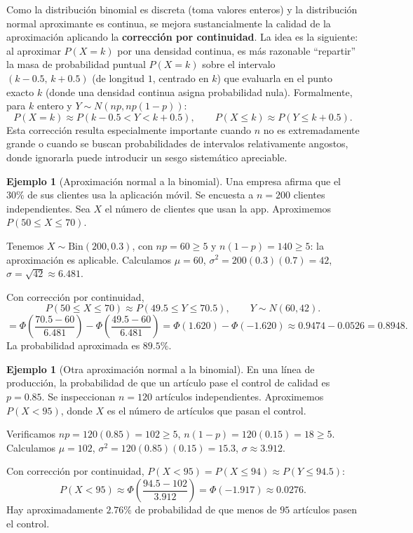 \documentclass[11pt,a4paper]{article}
\theoremstyle{plain}
\theoremstyle{definition}
\newtheorem{ejemplo}[teorema]{Ejemplo}
\theoremstyle{remark}
\begin{document}
Como la distribución binomial es discreta (toma valores enteros) y la distribución normal aproximante es continua, se mejora sustancialmente la calidad de la aproximación aplicando la \textbf{corrección por continuidad}. La idea es la siguiente: al aproximar $P(X=k)$ por una densidad continua, es más razonable ``repartir'' la masa de probabilidad puntual $P(X=k)$ sobre el intervalo $(k-0.5,\,k+0.5)$ (de longitud $1$, centrado en $k$) que evaluarla en el punto exacto $k$ (donde una densidad continua asigna probabilidad nula). Formalmente, para $k$ entero y $Y\sim N(np,np(1-p))$:
\[
P(X=k) \approx P(k-0.5<Y<k+0.5), \qquad P(X\leq k) \approx P(Y\leq k+0.5).
\]
Esta corrección resulta especialmente importante cuando $n$ no es extremadamente grande o cuando se buscan probabilidades de intervalos relativamente angostos, donde ignorarla puede introducir un sesgo sistemático apreciable.

\begin{ejemplo}[Aproximación normal a la binomial]
Una empresa afirma que el $30\%$ de sus clientes usa la aplicación móvil. Se encuesta a $n=200$ clientes independientes. Sea $X$ el número de clientes que usan la app. Aproximemos $P(50\leq X\leq70)$.

Tenemos $X\sim\text{Bin}(200,0.3)$, con $np=60\geq5$ y $n(1-p)=140\geq5$: la aproximación es aplicable. Calculamos $\mu=60$, $\sigma^2=200(0.3)(0.7)=42$, $\sigma=\sqrt{42}\approx6.481$.

Con corrección por continuidad,
\[
P(50\leq X\leq70) \approx P(49.5\leq Y\leq70.5), \qquad Y\sim N(60,42).
\]
\[
= \Phi\!\left(\frac{70.5-60}{6.481}\right) - \Phi\!\left(\frac{49.5-60}{6.481}\right) = \Phi(1.620)-\Phi(-1.620) \approx 0.9474-0.0526 = 0.8948.
\]
La probabilidad aproximada es $89.5\%$.
\end{ejemplo}

\begin{ejemplo}[Otra aproximación normal a la binomial]
En una línea de producción, la probabilidad de que un artículo pase el control de calidad es $p=0.85$. Se inspeccionan $n=120$ artículos independientes. Aproximemos $P(X<95)$, donde $X$ es el número de artículos que pasan el control.

Verificamos $np=120(0.85)=102\geq5$, $n(1-p)=120(0.15)=18\geq5$. Calculamos $\mu=102$, $\sigma^2=120(0.85)(0.15)=15.3$, $\sigma\approx3.912$.

Con corrección por continuidad, $P(X<95)=P(X\leq94)\approx P(Y\leq94.5)$:
\[
P(X<95) \approx \Phi\left(\frac{94.5-102}{3.912}\right) = \Phi(-1.917) \approx 0.0276.
\]
Hay aproximadamente $2.76\%$ de probabilidad de que menos de $95$ artículos pasen el control.
\end{ejemplo}
\end{document}
